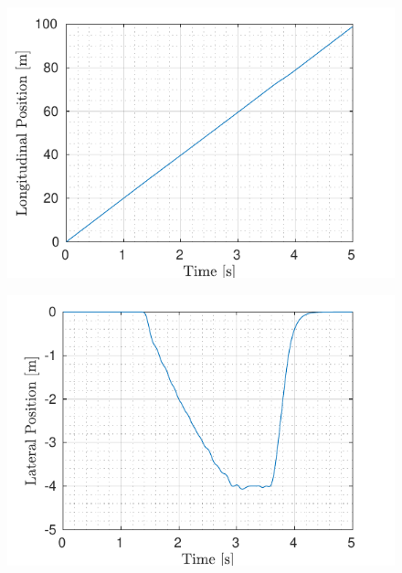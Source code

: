 \begin{figure}[!t] %
	\begin{minipage}[t]{0.5\textwidth}
		\includegraphics[width=\textwidth]{../../MATLAB/one_obstacle_right_overtaking/figure/LongitudinalPositionVsTime.pdf}
		\subcaption{}\label{fig:longitudinal_one_moving}
	\end{minipage}
	\begin{minipage}[t]{0.5\textwidth}
		\includegraphics[width=\textwidth]{../../MATLAB/one_obstacle_right_overtaking/figure/LateralPositionVsTime.pdf}
		\subcaption{}\label{fig:lateral_one_moving}
	\end{minipage}
	\begin{minipage}[t]{0.5\textwidth}

\end{minipage}
\end{figure}
